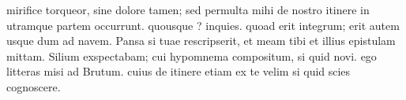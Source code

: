 


 mirifice torqueor, sine dolore tamen; sed permulta mihi de nostro itinere in utramque partem occurrunt. quousque ? inquies. quoad erit integrum; erit autem usque dum ad navem. Pansa si tuae rescripserit, et meam tibi et illius epistulam mittam. Silium exspectabam; cui hypomnema compositum, si quid novi. ego litteras misi ad Brutum. cuius de itinere etiam ex te velim si quid scies cognoscere.
